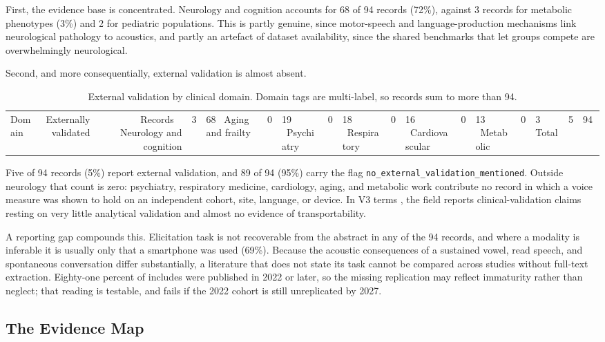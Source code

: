 \documentclass[11pt]{article}
\begin{document}
First, the evidence base is concentrated. Neurology and cognition accounts for
68 of 94 records (72\%), against 3 records for metabolic phenotypes (3\%) and 2
for pediatric populations. This is partly genuine, since motor-speech and
language-production mechanisms link neurological pathology to acoustics, and
partly an artefact of dataset availability, since the shared benchmarks that let
groups compete are overwhelmingly neurological.

Second, and more consequentially, external validation is almost absent.

\begin{table}[htbp]
\centering
\caption{External validation by clinical domain. Domain tags are multi-label, so records sum to more than 94.}
\begin{tabular}{lrr}
\toprule
Domain & Externally validated & Records \
\midrule
Neurology and cognition & 3 & 68 \
Aging and frailty & 0 & 19 \
Psychiatry & 0 & 18 \
Respiratory & 0 & 16 \
Cardiovascular & 0 & 13 \
Metabolic & 0 & 3 \
\midrule
Total & 5 & 94 \
\bottomrule
\end{tabular}
\end{table}

Five of 94 records (5\%) report external validation, and 89 of 94 (95\%) carry
the flag \texttt{no\_external\_validation\_mentioned}. Outside
neurology that count is zero: psychiatry, respiratory medicine, cardiology,
aging, and metabolic work contribute no record in which a voice measure was
shown to hold on an independent cohort, site, language, or device. In V3 terms
\citep{goldsack2020v3}, the field reports clinical-validation claims resting on
very little analytical validation and almost no evidence of transportability.

A reporting gap compounds this. Elicitation task is not recoverable from the
abstract in any of the 94 records, and where a modality is inferable it is
usually only that a smartphone was used (69\%). Because the acoustic
consequences of a sustained vowel, read speech, and spontaneous conversation
differ substantially, a literature that does not state its task cannot be
compared across studies without full-text extraction. Eighty-one percent of
includes were published in 2022 or later, so the missing replication may reflect
immaturity rather than neglect; that reading is testable, and fails if the 2022
cohort is still unreplicated by 2027.

\subsection{The Evidence Map}
\end{document}
